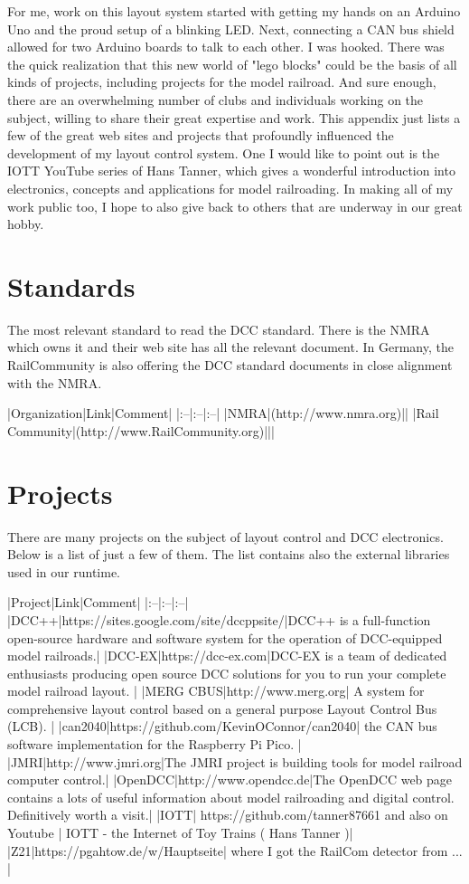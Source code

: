 For me, work on this layout system started with getting my hands on an Arduino Uno and the proud setup of a blinking LED. Next, connecting a CAN bus shield allowed for two Arduino boards to talk to each other. I was hooked. There was the quick realization that this new world of "lego blocks" could be the basis of all kinds of projects, including projects for the model railroad. And sure enough, there are an overwhelming number of clubs and individuals working on the subject, willing to share their great expertise and work. This appendix just lists a few of the great web sites and projects that profoundly influenced the development of my layout control system. One I would like to point out is the IOTT YouTube series of Hans Tanner, which gives a wonderful introduction into electronics, concepts and applications for model railroading. In making all of my work public too, I hope to also give back to others that are underway in our great hobby.

\section{Standards}

The most relevant standard to read the DCC standard. There is the NMRA which owns it and their web site has all the relevant document. In Germany, the RailCommunity is also offering the DCC standard documents in close alignment with the NMRA.

|Organization|Link|Comment|
|:--|:--|:--|
|NMRA|(http://www.nmra.org)||
|Rail Community|(http://www.RailCommunity.org)|||

\section{Projects}

There are many projects on the subject of layout control and DCC electronics. Below is a list of just a few of them. The list contains also the external libraries used in our runtime.

|Project|Link|Comment|
|:--|:--|:--|
|DCC++|https://sites.google.com/site/dccppsite/|DCC++ is a full-function open-source hardware and software system for the operation of DCC-equipped model railroads.|
|DCC-EX|https://dcc-ex.com|DCC-EX is a team of dedicated enthusiasts producing open source DCC solutions for you to run your complete model railroad layout. |
|MERG CBUS|http://www.merg.org| A system for comprehensive layout control based on a general purpose Layout Control Bus (LCB). |
|can2040|https://github.com/KevinOConnor/can2040| the CAN bus software implementation for the Raspberry Pi Pico. |
|JMRI|http://www.jmri.org|The JMRI project is building tools for model railroad computer control.|
|OpenDCC|http://www.opendcc.de|The OpenDCC web page contains a lots of useful information about model railroading and digital control. Definitively worth a visit.|
|IOTT| https://github.com/tanner87661 and also on Youtube | IOTT - the Internet of Toy Trains ( Hans Tanner )|
|Z21|https://pgahtow.de/w/Hauptseite| where I got the RailCom detector from ... |

